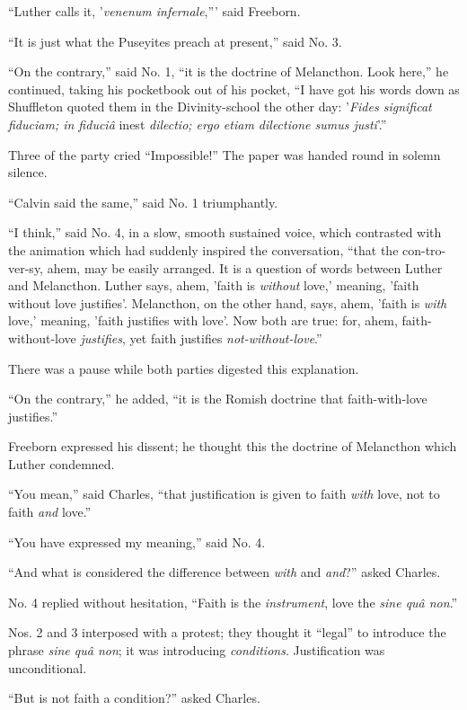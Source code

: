 ``Luther calls it, '\emph{venenum infernale},''' said
Freeborn.

``It is just what the Puseyites preach at present,'' said
No. 3.

``On the contrary,'' said No. 1, ``it is the doctrine
of Melancthon. Look here,'' he continued, taking his pocketbook
out of his pocket, ``I have got his words down as Shuffleton
quoted them in the Divinity-school the other day: '\emph{Fides significat
fiduciam; in fiduciâ} inest \emph{dilectio; ergo etiam dilectione
sumus justi}'.''

Three of the party cried ``Impossible!'' The paper was
handed round in solemn silence.

``Calvin said the same,'' said No. 1 triumphantly.

``I think,'' said No. 4, in a slow, smooth sustained voice,
which contrasted with the animation which had suddenly inspired the
conversation, ``that the con-tro-ver-sy, ahem, may be easily
arranged. It is a question of words between Luther and Melancthon.
Luther says, ahem, 'faith is \emph{without} love,' meaning, 'faith
without love justifies'. Melancthon, on the other hand, says, ahem,
'faith is \emph{with} love,' meaning, 'faith justifies with love'. Now both are true: for, ahem, faith-without-love \emph{justifies},
yet faith justifies \emph{not-without-love}.''

There was a pause while both parties digested this explanation.

``On the contrary,'' he added, ``it is the Romish
doctrine that faith-with-love justifies.''

Freeborn expressed his dissent; he thought this the doctrine of
Melancthon which Luther condemned.

``You mean,'' said Charles, ``that justification is
given to faith \emph{with} love, not to faith \emph{and} love.''

``You have expressed my meaning,'' said No. 4.

``And what is considered the difference between \emph{with} and
\emph{and}?'' asked Charles.

No. 4 replied without hesitation, ``Faith is the \emph{instrument},
love the \emph{sine quâ non}.''

Nos. 2 and 3 interposed with a protest; they thought it
``legal'' to introduce the phrase \emph{sine quâ non}; it was
introducing \emph{conditions}. Justification was unconditional.

``But is not faith a condition?'' asked Charles.

